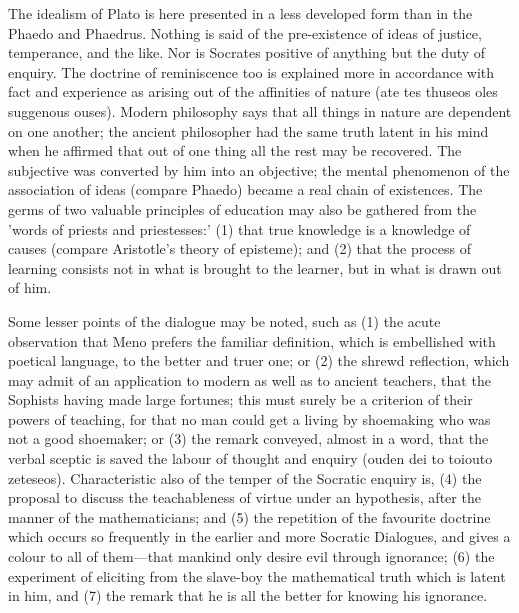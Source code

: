 \documentclass[11pt,letter]{article}
\begin{document}
\par  The idealism of Plato is here presented in a less developed form than in the Phaedo and Phaedrus. Nothing is said of the pre-existence of ideas of justice, temperance, and the like. Nor is Socrates positive of anything but the duty of enquiry. The doctrine of reminiscence too is explained more in accordance with fact and experience as arising out of the affinities of nature (ate tes thuseos oles suggenous ouses). Modern philosophy says that all things in nature are dependent on one another; the ancient philosopher had the same truth latent in his mind when he affirmed that out of one thing all the rest may be recovered. The subjective was converted by him into an objective; the mental phenomenon of the association of ideas (compare Phaedo) became a real chain of existences. The germs of two valuable principles of education may also be gathered from the 'words of priests and priestesses:' (1) that true knowledge is a knowledge of causes (compare Aristotle's theory of episteme); and (2) that the process of learning consists not in what is brought to the learner, but in what is drawn out of him.

\par  Some lesser points of the dialogue may be noted, such as (1) the acute observation that Meno prefers the familiar definition, which is embellished with poetical language, to the better and truer one; or (2) the shrewd reflection, which may admit of an application to modern as well as to ancient teachers, that the Sophists having made large fortunes; this must surely be a criterion of their powers of teaching, for that no man could get a living by shoemaking who was not a good shoemaker; or (3) the remark conveyed, almost in a word, that the verbal sceptic is saved the labour of thought and enquiry (ouden dei to toiouto zeteseos). Characteristic also of the temper of the Socratic enquiry is, (4) the proposal to discuss the teachableness of virtue under an hypothesis, after the manner of the mathematicians; and (5) the repetition of the favourite doctrine which occurs so frequently in the earlier and more Socratic Dialogues, and gives a colour to all of them—that mankind only desire evil through ignorance; (6) the experiment of eliciting from the slave-boy the mathematical truth which is latent in him, and (7) the remark that he is all the better for knowing his ignorance.
\end{document}
